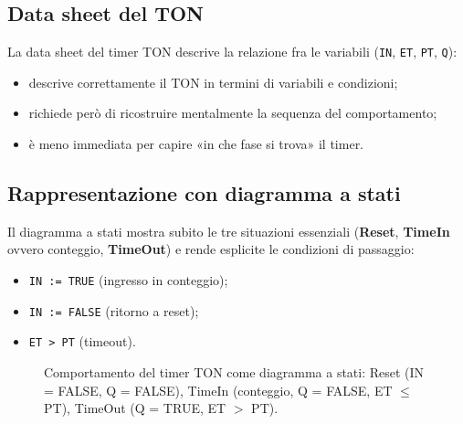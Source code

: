\subsection{Data sheet del TON}
La data sheet del timer TON descrive la relazione fra le variabili (\texttt{IN}, \texttt{ET}, \texttt{PT}, \texttt{Q}):
\begin{itemize}
    \item descrive correttamente il TON in termini di variabili e condizioni;
    \item richiede però di ricostruire mentalmente la sequenza del comportamento;
    \item è meno immediata per capire «in che fase si trova» il timer.
\end{itemize}

\subsection{Rappresentazione con diagramma a stati}
Il diagramma a stati mostra subito le tre situazioni essenziali (\textbf{Reset}, \textbf{TimeIn} ovvero conteggio, \textbf{TimeOut}) e rende esplicite le condizioni di passaggio:
\begin{itemize}
    \item \texttt{IN := TRUE} (ingresso in conteggio);
    \item \texttt{IN := FALSE} (ritorno a reset);
    \item \texttt{ET > PT} (timeout).
\end{itemize}

\begin{figure}[htbp]
\centering
{}
\caption{Comportamento del timer TON come diagramma a stati: Reset (IN = FALSE, Q = FALSE), TimeIn (conteggio, Q = FALSE, ET $\le$ PT), TimeOut (Q = TRUE, ET $>$ PT).}
\label{fig:ton-stati}
\end{figure}

